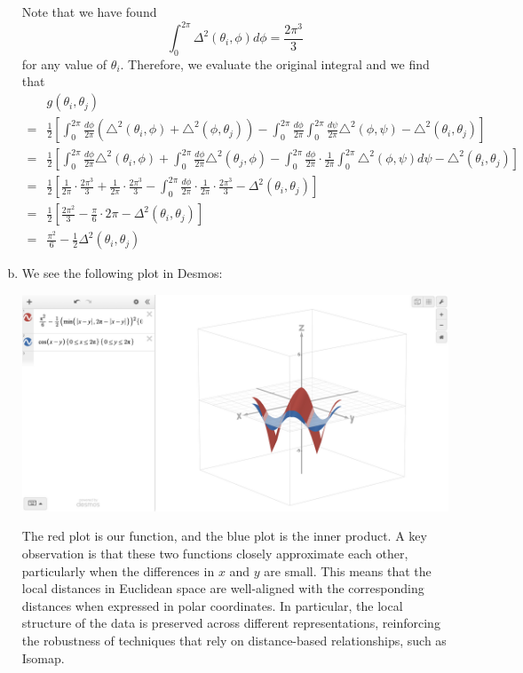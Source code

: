 \documentclass[11pt]{scrartcl}
\begin{document}
\begin{enumerate}[(a)]
    Note that we have found \[\int_0^{2\pi} \Delta^2(\theta_i, \phi) d\phi = \frac{2\pi^3}{3}\]
    for any value of $\theta_i$. Therefore, we evaluate the original integral and we find that \begin{align*}
        & g(\theta_i, \theta_j) \\
        =& \frac{1}{2} \left[ \int_0^{2\pi} \frac{d\phi}{2\pi} \left( \triangle^2 (\theta_i, \phi) + \triangle^2 (\phi, \theta_j) \right) - \int_0^{2\pi} \frac{d\phi}{2\pi} \int_0^{2\pi} \frac{d\psi}{2\pi} \triangle^2 (\phi, \psi) - \triangle^2 (\theta_i, \theta_j) \right] \\
        =& \frac{1}{2} \left[ \int_0^{2\pi} \frac{d\phi}{2\pi} \triangle^2 (\theta_i, \phi) + \int_0^{2\pi} \frac{d\phi}{2\pi} \triangle^2 (\theta_j, \phi) - \int_0^{2\pi} \frac{d\phi}{2\pi} \cdot \frac{1}{2\pi} \int_0^{2\pi} \triangle^2 (\phi, \psi) d\psi - \triangle^2 (\theta_i, \theta_j) \right] \\
        =& \frac 12 \left[\frac{1}{2\pi} \cdot \frac{2\pi^3}{3} + \frac{1}{2\pi} \cdot \frac{2\pi^3}{3} - \int_0^{2\pi} \frac{d\phi}{2\pi} \cdot \frac{1}{2\pi} \cdot \frac{2\pi^3}{3} - \Delta^2(\theta_i, \theta_j)\right] \\
        =& \frac 12\left[\frac{2\pi^2}{3} - \frac{\pi}{6} \cdot 2\pi - \Delta^2(\theta_i, \theta_j)\right] \\
        =& \frac{\pi^2}{6} - \frac 12\Delta^2(\theta_i, \theta_j)
    \end{align*}
    \item We see the following plot in Desmos: \begin{center}
        \includegraphics[width = 13cm]{hw1-img/hw1-p3.png}
    \end{center}
    The red plot is our function, and the blue plot is the inner product. A key observation is that these two functions closely approximate each other, particularly when the differences in $x$ and $y$ are small. This means that the local distances in Euclidean space are well-aligned with the corresponding distances when expressed in polar coordinates. In particular, the local structure of the data is preserved across different representations, reinforcing the robustness of techniques that rely on distance-based relationships, such as Isomap.
\end{enumerate}
\end{document}

